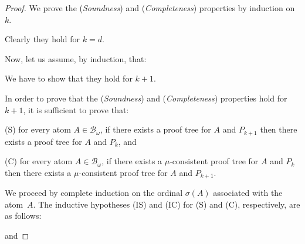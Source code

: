 \documentclass[english]{tlp}
\begin{document}
\begin{proof} We prove the ({\em Soundness}) and ({\em Completeness}) properties
by induction on $k$.

\noindent
Clearly they hold for $k=d$.

\noindent
Now, let us assume, by induction, that: 

\smallskip



\noindent
{}

\smallskip

We have to show that they hold
 for $k\!+\!1$. 
 
 In order to prove that the 
({\em Soundness}) and ({\em Completeness})
 properties hold for $k\!+\!1$, it is sufficient to prove that:

\smallskip

\noindent (S) for every atom \( A\in\mathcal{B}_{\omega} \), 
if there exists a proof tree for $A$ and \( P_{k+1} \)
then there exists a proof tree for \( A \) and \(
 P_{k}\), and

\noindent (C) for every atom \( A\in\mathcal{B}_{\omega} \),
if there exists a \(\mu\)-consistent proof tree for
$A$ and \( P_k \) then there exists a \(\mu\)-consistent proof tree
for \( A \) and \(  P_{k+1} \).

\smallskip

\noindent We proceed by complete induction on the ordinal \( \sigma
(A) \) associated with the atom~\( A \). The inductive hypotheses
(IS) and (IC) for (S) and (C), respectively, are as follows:
\smallskip{}

\noindent
{}

\medskip{}
and

\medskip{}
\noindent 
{}




\end{proof}
\end{document}
